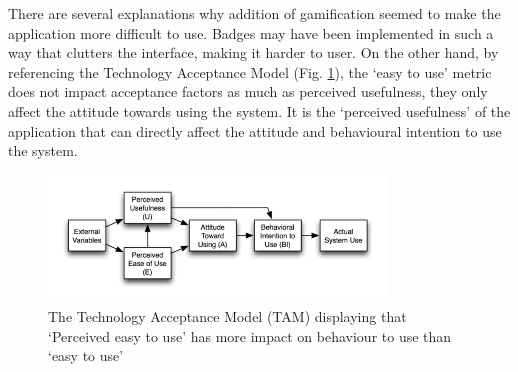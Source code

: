 	There are several explanations why addition of gamification seemed to make the application more difficult to use. Badges may have been implemented in such a way that clutters the interface, making it harder to user. On the other hand, by referencing the Technology Acceptance Model (Fig. \ref{fig:TAMagain}), the `easy to use' metric does not impact acceptance factors as much as perceived usefulness, they only affect the attitude towards using the system.  It is the `perceived usefulness' of the application that can directly affect the attitude and behavioural intention to use the system.
    \begin{figure}[H]
 \centering
  \includegraphics[width=0.80\textwidth]{img/TAM.png}
     \caption{The Technology Acceptance Model (TAM) displaying that `Perceived easy to use' has more impact on behaviour to use than `easy to use'}
     \label{fig:TAMagain}
\end{figure}

